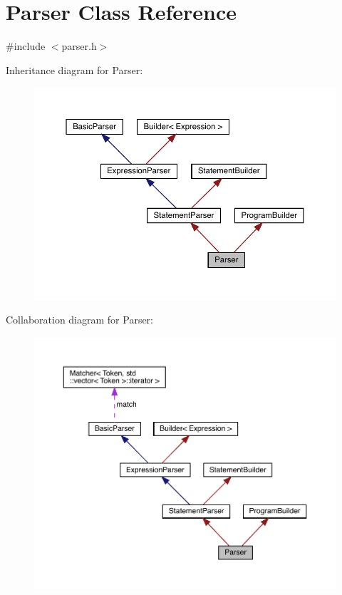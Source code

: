 \hypertarget{class_parser}{}\section{Parser Class Reference}
\label{class_parser}


{\ttfamily \#include $<$parser.\+h$>$}



Inheritance diagram for Parser\+:\nopagebreak
\begin{figure}[H]
\begin{center}
\leavevmode
\includegraphics[width=350pt]{class_parser__inherit__graph}
\end{center}
\end{figure}


Collaboration diagram for Parser\+:\nopagebreak
\begin{figure}[H]
\begin{center}
\leavevmode
\includegraphics[width=350pt]{class_parser__coll__graph}
\end{center}
\end{figure}
